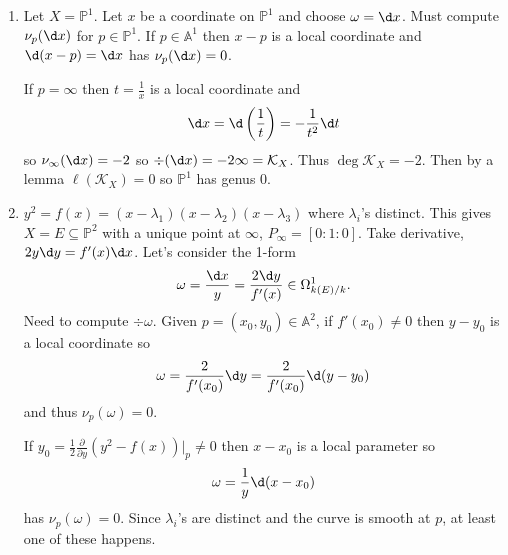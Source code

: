 \documentclass[a4paper]{article}
\renewcommand{\A}{\mathbb{A}}
\renewcommand*{\P}{\mathbb{P}}
\begin{document}
\begin{eg}\leavevmode
  \begin{enumerate}
  \item Let \(X = \P^1\). Let \(x\) be a coordinate on \(\P^1\) and choose \(\omega = \d x\). Must compute \(\nu_p(\d x)\) for \(p \in \P^1\). If \(p \in \A^1\) then \(x - p\) is a local coordinate and \(\d (x - p) = \d x\) has \(\nu_p(\d x) = 0\).

    If \(p = \infty\) then \(t = \frac{1}{x}\) is a local coordinate and
    \[
      \d x = \d \left( \frac{1}{t} \right) = -\frac{1}{t^2} \d t
    \]
    so \(\nu_\infty(\d x) = -2\) so \(\div(\d x) = -2 \infty = \mathcal K_X\). Thus \(\deg \mathcal K_X = -2\). Then by a lemma \(\ell(\mathcal K_X) = 0\) so \(\P^1\) has genus \(0\).
  \item \(y^2 = f(x) = (x - \lambda_1)(x - \lambda_2)(x - \lambda_3)\) where \(\lambda_i\)'s distinct. This gives \(X = E \subseteq \P^2\) with a unique point at \(\infty\), \(P_\infty = [0:1:0]\). Take derivative, \(2 y \d y = f'(x) \d x\). Let's consider the 1-form
    \[
      \omega = \frac{\d x}{y} = \frac{2 \d y}{f'(x)} \in \Omega^1_{k(E)/k}.
    \]
    Need to compute \(\div \omega\). Given \(p = (x_0, y_0) \in \A^2\), if \(f'(x_0) \neq 0\) then \(y - y_0\) is a local coordinate so
    \[
      \omega = \frac{2}{f'(x_0)} \d y = \frac{2}{f'(x_0)} \d (y - y_0)
    \]
    and thus \(\nu_p(\omega) = 0\).

    If \(y_0 = \frac{1}{2} \frac{\partial  }{\partial y}(y^2 - f(x))|_p \neq 0\) then \(x - x_0\) is a local parameter so
    \[
      \omega = \frac{1}{y} \d (x - x_0)
    \]
    has \(\nu_p(\omega) = 0\). Since \(\lambda_i\)'s are distinct and the curve is smooth at \(p\), at least one of these happens.


\end{enumerate}
\end{eg}
\end{document}
